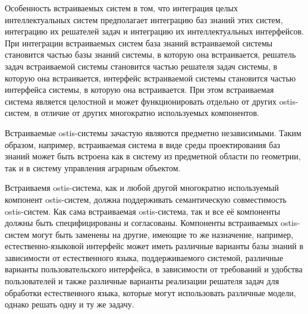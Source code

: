 Особенность встраиваемых систем в том, что интеграция целых интеллектуальных систем предполагает интеграцию баз знаний этих систем, интеграцию их решателей задач и интеграцию их интеллектуальных интерфейсов. При интеграции встраиваемых систем база знаний встраиваемой системы становится частью базы знаний системы, в которую она встраивается, решатель задач встраиваемой системы становится частью решателя задач системы, в которую она встраивается, интерфейс встраиваемой системы становится частью интерфейса системы, в которую она встраивается. При этом встраиваемая система является целостной и может функционировать отдельно от других ostis-систем, в отличие от других многократно используемых компонентов.

Встраиваемые ostis-системы зачастую являются предметно независимыми. Таким образом, например, встраиваемая система в виде среды проектирования баз знаний может быть встроена как в систему из предметной области по геометрии, так и в систему управления аграрным объектом.

Встраиваемя ostis-система, как и любой другой многократно используемый компонент ostis-систем, должна поддерживать семантическую совместимость ostis-систем. Как сама встраиваемая ostis-система, так и все её компоненты должны быть специфицированы и согласованы. Компоненты встраиваемых ostis-систем могут быть заменены на другие, имеющие то же назначение, например, естественно-языковой интерфейс может иметь различные варианты базы знаний в зависимости от естественного языка, поддерживаемого системой, различные варианты пользовательского интерфейса, в зависимости от требований и удобства пользователей и также различные варианты реализации решателя задач для обработки естественного языка, которые могут использовать различные модели, однако решать одну и ту же задачу.

%